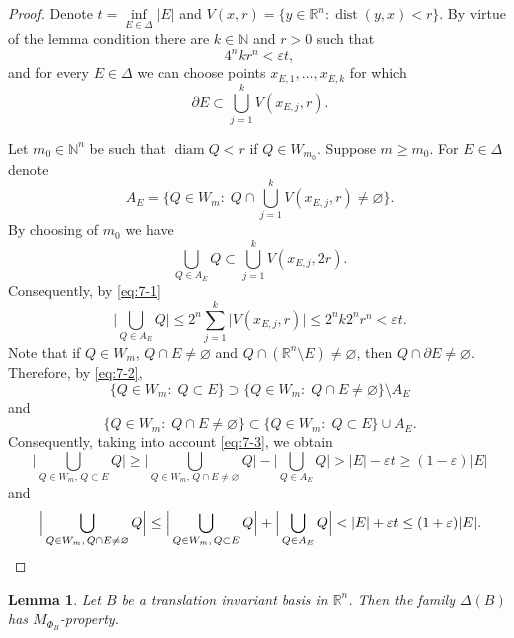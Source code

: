 \documentclass[12pt,reqno]{article}
\newtheorem{lemma}{Lemma}
\theoremstyle{remark}
\newcommand{\dist}{\operatorname{dist}}
\newcommand{\diam}{\operatorname{diam}}
\begin{document}
\begin{proof}
Denote $t=\inf\limits_{E\in\Delta}|E|$ and $V(x,r)=\{y\in\mathbb{R}^n:\dist(y,x)<r\}$. By virtue of the lemma condition there are $k\in\mathbb{N}$ and $r>0$ such that
\begin{equation}\label{eq:7-1}
    4^nkr^n<\varepsilon t,
\end{equation}
and for every $E\in\Delta$ we can choose points $x_{E,1},\dots,x_{E,k}$ for which
\begin{equation}\label{eq:7-2}
    \partial E\subset \bigcup_{j=1}^k V(x_{E,j},r).
\end{equation}

Let $m_0\in\mathbb{N}^n$ be such that $\diam Q<r$ if $Q\in W_{m_0}$. Suppose $m\geq m_0$. For $E\in\Delta$ denote
$$  A_E=\Big\{Q\in W_m:\;Q\cap\bigcup_{j=1}^k V(x_{E,j},r)\neq\varnothing\Big\}.       $$
By choosing of $m_0$ we have
$$  \bigcup_{Q \in A_E} Q\subset \bigcup_{j=1}^k V(x_{E,j},2r).      $$
Consequently, by \eqref{eq:7-1}
\begin{equation}\label{eq:7-3}
    \Big|\bigcup_{Q \in A_E} Q\Big|\leq 2^n\sum_{j=1}^k \big|V(x_{E,j},r)\big|\leq 2^nk2^nr^n<\varepsilon t.
\end{equation}
Note that if $Q\in W_m$, $Q\cap E\neq\varnothing$ and $Q\cap(\mathbb{R}^n\setminus E)\neq\varnothing$, then $Q\cap\partial E\neq\varnothing$. Therefore, by \eqref{eq:7-2},
$$  \big\{Q\in W_m:\;Q\subset E\big\}\supset \big\{Q\in W_m:\;Q\cap E\neq\varnothing\big\}\setminus A_E   $$
and
$$  \big\{Q\in W_m:\;Q\cap E\neq\varnothing\big\}\subset \big\{Q\in W_m:\;Q\subset E\big\}\cup A_E.     $$
Consequently, taking into account \eqref{eq:7-3}, we obtain
$$  \Big|\bigcup_{Q\in W_m,\,Q\subset E} Q\Big|\geq \Big|\bigcup_{Q\in W_m,\,Q\cap E\neq\varnothing} Q\Big|-\Big|\bigcup_{Q\in A_E} Q\Big|>
            |E|-\varepsilon t\geq (1-\varepsilon)|E|        $$
and
\[  \Big|\bigcup_{Q\in W_m,\,Q\cap E\neq\varnothing} Q\Big|\leq \Big|\bigcup_{Q\in W_m,\,Q\subset E} Q\Big|+\Big|\bigcup_{Q\in A_E} Q\Big|<
            |E|+\varepsilon t\leq (1+\varepsilon)|E|.        \qedhere       \]
\end{proof}

\begin{lemma}\label{lem:8}
Let $B$ be a translation invariant basis in $\mathbb{R}^n$. Then the family $\Delta(B)$ has $M_{\Phi_B}$-property.
\end{lemma}
\end{document}
